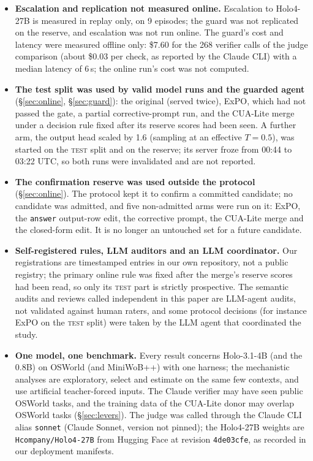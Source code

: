 \begin{itemize}
\item \textbf{Escalation and replication not measured online.} Escalation to Holo4-27B is measured in replay only, on 9 episodes; the guard was not replicated on the reserve, and escalation was not run online. The guard's cost and latency were measured offline only: \$7.60 for the 268 verifier calls of the judge comparison (about \$0.03 per check, as reported by the Claude CLI) with a median latency of 6\,s; the online run's cost was not computed. %
\item \textbf{The test split was used by \onNTestRuns{} valid model runs and the guarded agent} (\S\ref{sec:online}, \S\ref{sec:guard}): the original (served twice), ExPO, which had not passed the gate, a partial corrective-prompt run, and the CUA-Lite merge under a decision rule fixed after its reserve scores had been seen. A further arm, the output head scaled by 1.6 (sampling at an effective $T=0.5$), was started on the \textsc{test} split and on the reserve; its server froze from 00:44 to 03:22 UTC, so both runs were invalidated and are not reported. %
\item \textbf{The confirmation reserve was used outside the protocol} (\S\ref{sec:online}). The protocol kept it to confirm a committed candidate; no candidate was admitted, and five non-admitted arms were run on it: ExPO, the \texttt{answer} output-row edit, the corrective prompt, the CUA-Lite merge and the closed-form edit. It is no longer an untouched set for a future candidate.
\item \textbf{Self-registered rules, LLM auditors and an LLM coordinator.} Our registrations are timestamped entries in our own repository, not a public registry; the primary online rule was fixed after the merge's reserve scores had been read, so only its \textsc{test} part is strictly prospective. The semantic audits and reviews called independent in this paper are LLM-agent audits, not validated against human raters, and some protocol decisions (for instance ExPO on the \textsc{test} split) were taken by the LLM agent that coordinated the study.
\item \textbf{One model, one benchmark.} Every result concerns Holo-3.1-4B (and the 0.8B) on OSWorld (and MiniWoB++) with one harness; the mechanistic analyses are exploratory, select and estimate on the same few contexts, and use artificial teacher-forced inputs. The Claude verifier may have seen public OSWorld tasks, and the training data of the CUA-Lite donor may overlap OSWorld tasks (\S\ref{sec:levers}). The judge was called through the Claude CLI alias \texttt{sonnet} (Claude Sonnet, version not pinned); the Holo4-27B weights are \texttt{Hcompany/Holo4-27B} from Hugging Face at revision \texttt{4de03cfe}, as recorded in our deployment manifests. %

\end{itemize}
